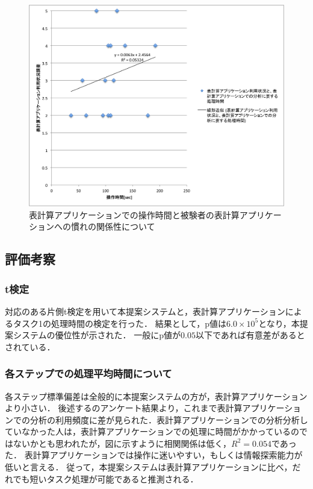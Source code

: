 \documentclass[sotsuron]{kuee}
\begin{document}
			\begin{figure}
				\begin{center}
					\includegraphics[width=\linewidth]{./png/result05.png}
				\end{center}
				\caption{表計算アプリケーションでの操作時間と被験者の表計算アプリケーションへの慣れの関係性について}
		  		\label{fig:result05}
			\end{figure}
		\subsection{評価考察}
			\subsubsection{t検定}
				対応のある片側t検定を用いて本提案システムと，表計算アプリケーションによるタスク1の処理時間の検定を行った．
				結果として，p値は$6.0 \times 10^5$となり，本提案システムの優位性が示された．
				一般にp値が$0.05$以下であれば有意差があるとされている．
			\subsubsection{各ステップでの処理平均時間について}
				各ステップ標準偏差は全般的に本提案システムの方が，表計算アプリケーションより小さい．
				後述するのアンケート結果より，これまで表計算アプリケーションでの分析の利用頻度に差が見られた．表計算アプリケーションでの分析分析していなかった人は，表計算アプリケーションでの処理に時間がかかっているのではないかとも思われたが，図に示すように相関関係は低く，$R^2 = 0.054$であった．
				表計算アプリケーションでは操作に迷いやすい，もしくは情報探索能力が低いと言える．
				従って，本提案システムは表計算アプリケーションに比べ，だれでも短いタスク処理が可能であると推測される．
\end{document}
